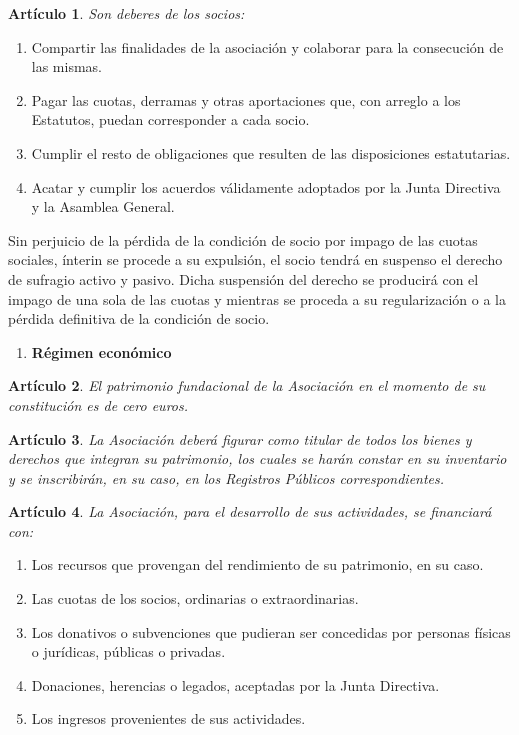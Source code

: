 \documentclass[a4paper,12pt]{article}
\theoremstyle{mystyle}		%
\newtheorem{art}{Artículo}	%
\begin{document}
\begin{onehalfspace}
\begin{art}
Son deberes de los socios:
\end{art}
\begin{enumerate}[label={\alph*)}]
 \item Compartir las finalidades de la asociación y colaborar para la consecución de las mismas.
 \item Pagar las cuotas, derramas y otras aportaciones que, con arreglo a los Estatutos, puedan corresponder a cada socio.
 \item Cumplir el resto de obligaciones que resulten de las disposiciones estatutarias.
 \item Acatar y cumplir los acuerdos válidamente adoptados por la Junta Directiva y la Asamblea General.
\end{enumerate}

Sin perjuicio de la pérdida de la condición de socio por impago de las cuotas sociales, ínterin se procede a su expulsión, el socio tendrá en suspenso el derecho de sufragio activo y pasivo. Dicha suspensión del derecho se producirá con el impago de una sola de las cuotas y mientras se proceda a su regularización o a la pérdida definitiva de la condición de socio.

\bigskip

\begin{enumerate}[resume*=capitulo]\centering
 \item \textbf{Régimen económico}
\end{enumerate}

\begin{art}
El patrimonio fundacional de la Asociación en el momento de su constitución es de cero euros.
\end{art}

\begin{art}
La Asociación deberá figurar como titular de todos los bienes y derechos que integran su patrimonio, los cuales se harán constar en su inventario y se inscribirán, en su caso, en los Registros Públicos correspondientes.
\end{art}

\begin{art}
La Asociación, para el desarrollo de sus actividades, se financiará con:
\end{art}
\begin{enumerate}[label={\alph*)}]
 \item Los recursos que provengan del rendimiento de su patrimonio, en su caso.
 \item Las cuotas de los socios, ordinarias o extraordinarias.
 \item Los donativos o subvenciones que pudieran ser concedidas por personas físicas o jurídicas, públicas o privadas.
 \item Donaciones, herencias o legados, aceptadas por la Junta Directiva.
 \item Los ingresos provenientes de sus actividades.
\end{enumerate}


\end{onehalfspace}
\end{document}
